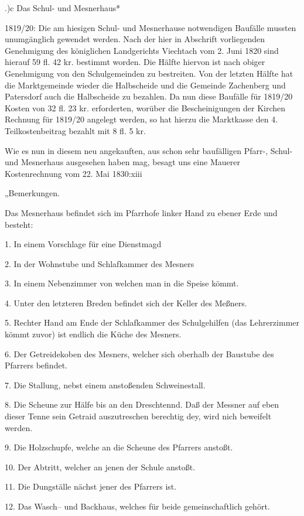 \documentclass{book}
\begin{document}
.)c Das Schul- und Mesnerhaus*

1819/20: Die am hiesigen Schul- und Mesnerhause notwendigen Baufälle mussten
unumgänglich gewendet werden. Nach der hier in Abschrift vorliegenden
Genehmigung des königlichen Landgerichts Viechtach vom 2. Juni 1820 sind hierauf
59 fl. 42 kr. bestimmt worden. Die Hälfte hiervon ist nach obiger Genehmigung
von den Schulgemeinden zu bestreiten. Von der letzten Hälfte hat die
Marktgemeinde wieder die Halbscheide und die Gemeinde Zachenberg und Patersdorf
auch die Halbscheide zu bezahlen. Da nun diese Baufälle für 1819/20 Kosten von
32 fl. 23 kr. erforderten, worüber die Bescheinigungen der Kirchen Rechnung für
1819/20 angelegt werden, so hat hierzu die Marktkasse den 4. Teilkostenbeitrag
bezahlt mit 8 fl. 5 kr.

Wie es nun in diesem neu angekauften, aus schon sehr baufälligen Pfarr-, Schul-
und Mesnerhaus ausgesehen haben mag, besagt uns eine Mauerer Kostenrechnung vom
22. Mai 1830:xiii

„Bemerkungen.

 Das Mesnerhaus befindet sich im Pfarrhofe linker Hand zu ebener Erde und
 besteht:

1. In einem Vorschlage für eine Dienstmagd

2. In der Wohnstube und Schlafkammer des Mesners

3. In einem Nebenzimmer von welchen man in die Speise kömmt.

4. Unter den letzteren Breden befindet sich der Keller des Meßners.

5. Rechter Hand am Ende der Schlafkammer des Schulgehilfen (das Lehrerzimmer
kömmt zuvor) ist endlich die Küche des Mesners.

6. Der Getreidekoben des Mesners, welcher sich oberhalb der Baustube des
Pfarrers befindet.

7. Die Stallung, nebst einem anstoßenden Schweinestall.

8. Die Scheune  zur Hälfe bis an den Dreschtennd. Daß der Messner auf eben
dieser Tenne sein Getraid auszutreschen berechtig dey, wird nich beweifelt
werden.

9. Die Holzschupfe, welche an die Scheune des Pfarrers anstoßt.

10. Der Abtritt, welcher an jenen der Schule anstoßt.

11. Die Dungställe nächst jener des Pfarrers ist.

12. Das Wasch– und Backhaus, welches für beide gemeinschaftlich gehört.
\end{document}
